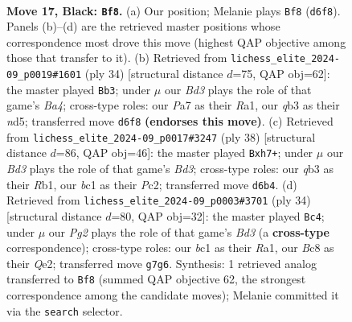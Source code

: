 \documentclass[11pt]{article}
\begin{document}
\clearpage

\begin{figure}[p]\centering
\begin{subfigure}{0.46\textwidth}\centering
\resizebox{\linewidth}{!}{%
\newchessgame
\chessboard[
  setfen={r1bk3r/ppq3pp/2pb4/3p1p2/P2P4/1Q2PN2/1P3PPP/1RB1K2R b K - 0 17},
  showmover=false,
  pgfstyle=straightmove, color=movearrow, markmove={d6-f8}
]}
\caption{}
\end{subfigure}\hfill
\begin{subfigure}{0.46\textwidth}\centering
\resizebox{\linewidth}{!}{%
\newchessgame
\chessboard[
  setfen={r1b2rk1/1p1p1pp1/pq5p/3nP3/BP1p1P2/P2P4/6PP/R1BQ1RK1 w - - 1 18},
  showmover=false,
  pgfstyle=straightmove, color=movearrow, markmove={a4-b3}
]}
\caption{}
\end{subfigure}
\\[4pt]
\begin{subfigure}{0.46\textwidth}\centering
\resizebox{\linewidth}{!}{%
\newchessgame
\chessboard[
  setfen={r1bqr1k1/pp3ppp/2n1p3/2BpP3/5P2/P1RB4/2PQ2PP/1R4K1 w - - 2 20},
  showmover=false,
  pgfstyle=straightmove, color=movearrow, markmove={d3-h7}
]}
\caption{}
\end{subfigure}\hfill
\begin{subfigure}{0.46\textwidth}\centering
\resizebox{\linewidth}{!}{%
\newchessgame
\chessboard[
  setfen={r3k2r/1b3ppp/1qp2n2/p3p3/P2pP3/BP1B4/4QPPP/R2R2K1 w kq - 2 18},
  showmover=false,
  pgfstyle=straightmove, color=movearrow, markmove={d3-c4}
]}
\caption{}
\end{subfigure}
\caption{\textbf{Move 17, Black: \texttt{Bf8}.} (a) Our position; Melanie plays \texttt{Bf8} (\texttt{d6f8}). Panels (b)--(d) are the retrieved master positions whose correspondence most drove this move (highest QAP objective among those that transfer to it). (b) Retrieved from \texttt{lichess\_elite\_2024-09\_p0019\#1601} (ply 34) [structural distance $d$=75, QAP obj=62]: the master played \texttt{Bb3}; under $\mu$ our \emph{Bd3} plays the role of that game's \emph{Ba4}; cross-type roles: our \emph{P}a7 as their \emph{R}a1, our \emph{q}b3 as their \emph{n}d5; transferred move \texttt{d6f8} \textbf{(endorses this move)}. (c) Retrieved from \texttt{lichess\_elite\_2024-09\_p0017\#3247} (ply 38) [structural distance $d$=86, QAP obj=46]: the master played \texttt{Bxh7+}; under $\mu$ our \emph{Bd3} plays the role of that game's \emph{Bd3}; cross-type roles: our \emph{q}b3 as their \emph{R}b1, our \emph{b}c1 as their \emph{P}c2; transferred move \texttt{d6b4}. (d) Retrieved from \texttt{lichess\_elite\_2024-09\_p0003\#3701} (ply 34) [structural distance $d$=80, QAP obj=32]: the master played \texttt{Bc4}; under $\mu$ our \emph{Pg2} plays the role of that game's \emph{Bd3} (a \textbf{cross-type} correspondence); cross-type roles: our \emph{b}c1 as their \emph{R}a1, our \emph{B}c8 as their \emph{Q}e2; transferred move \texttt{g7g6}. Synthesis: 1 retrieved analog transferred to \texttt{Bf8} (summed QAP objective 62, the strongest correspondence among the candidate moves); Melanie committed it via the \texttt{search} selector.}
\label{fig:thought-m33}
\end{figure}
\end{document}
